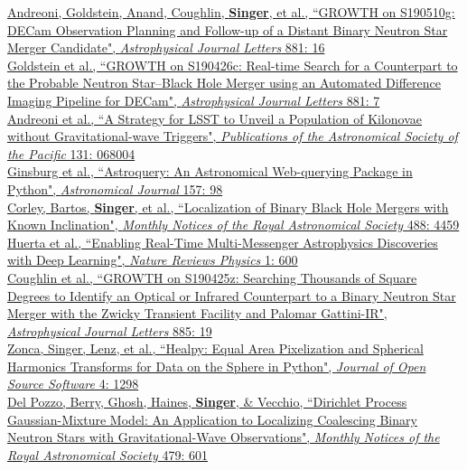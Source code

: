 \documentclass[10pt, letterpaper]{article} %
\newcommand{\years}[1]{\marginnote{\scriptsize #1}} %
\begin{document}
%
\years{2019}\href{https://doi.org/10.3847/2041-8213/ab3399}{Andreoni, Goldstein, Anand, Coughlin, \textbf{Singer}, et al., “GROWTH on S190510g: DECam Observation Planning and Follow-up of a Distant Binary Neutron Star Merger Candidate", \emph{Astrophysical Journal Letters} 881: 16}\\[0.125cm]
%
\years{2019}\href{https://doi.org/10.3847/2041-8213/ab3046}{Goldstein et al., “GROWTH on S190426c: Real-time Search for a Counterpart to the Probable Neutron Star–Black Hole Merger using an Automated Difference Imaging Pipeline for DECam", \emph{Astrophysical Journal Letters} 881: 7}\\[0.125cm]
%
\years{2019}\href{https://doi.org/10.1088/1538-3873/ab1531}{Andreoni et al., “A Strategy for LSST to Unveil a Population of Kilonovae without Gravitational-wave Triggers", \emph{Publications of the Astronomical Society of the Pacific} 131: 068004}\\[0.125cm]
%
\years{2019}\href{https://doi.org/10.3847/1538-3881/aafc33}{Ginsburg et al., “Astroquery: An Astronomical Web-querying Package in Python", \emph{Astronomical Journal} 157: 98}\\[0.125cm]
%
\years{2019}\href{https://doi.org/10.1093/mnras/stz2072}{Corley, Bartos, \textbf{Singer}, et al., “Localization of Binary Black Hole Mergers with Known Inclination", \emph{Monthly Notices of the Royal Astronomical Society} 488: 4459}\\[0.125cm]
%
\years{2019}\href{https://doi.org/10.1038/s42254-019-0097-4}{Huerta et al., “Enabling Real-Time Multi-Messenger Astrophysics Discoveries with Deep Learning", \emph{Nature Reviews Physics} 1: 600}\\[0.125cm]
%
\years{2019}\href{https://doi.org/10.3847/2041-8213/ab4ad8}{Coughlin et al., “GROWTH on S190425z: Searching Thousands of Square Degrees to Identify an Optical or Infrared Counterpart to a Binary Neutron Star Merger with the Zwicky Transient Facility and Palomar Gattini-IR", \emph{Astrophysical Journal Letters} 885: 19}\\[0.125cm]
%
\years{2019}\href{https://doi.org/10.21105/joss.01298}{Zonca, Singer, Lenz, et al., “Healpy: Equal Area Pixelization and Spherical Harmonics Transforms for Data on the Sphere in Python", \emph{Journal of Open Source Software} 4: 1298}\\[0.125cm]
%
\years{2018}\href{https://doi.org/10.1093/mnras/sty1485}{Del Pozzo, Berry, Ghosh, Haines, \textbf{Singer}, \& Vecchio, “Dirichlet Process Gaussian-Mixture Model: An Application to Localizing Coalescing Binary Neutron Stars with Gravitational-Wave Observations", \emph{Monthly Notices of the Royal Astronomical Society} 479: 601}\\[0.125cm]
\end{document}
